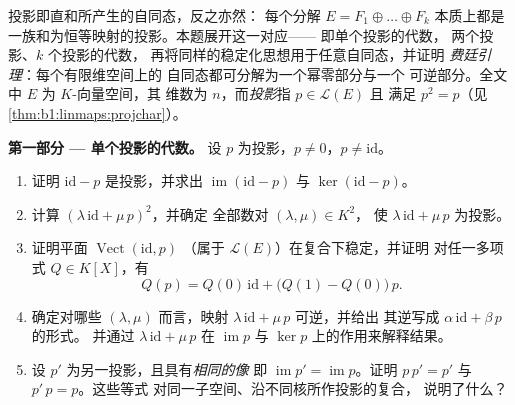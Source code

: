 \begin{problem}\label{pb:b1:linmaps:1}
投影即直和所产生的自同态，反之亦然：
每个分解 $E = F_1 \oplus \dots \oplus F_k$ 本质上都是
一族和为恒等映射的投影。本题展开这一对应——
即单个投影的代数，
两个投影、$k$ 个投影的代数，
再将同样的稳定化思想用于任意自同态，并证明
\emph{费廷引理}：每个有限维空间上的
自同态都可分解为一个幂零部分与一个
可逆部分。全文中 $E$ 为 $K$-向量空间，其
维数为 $n$，而\emph{投影}指 $p \in \mathcal{L}(E)$ 且
满足 $p^2 = p$（见\cref{thm:b1:linmaps:projchar}）。

\medskip
\noindent\textbf{第一部分 --- 单个投影的代数。}
设 $p$ 为投影，$p \neq 0$，$p \neq \mathrm{id}$。
\begin{enumerate}
  \item 证明 $\mathrm{id} - p$ 是投影，并求出
        $\operatorname{im}(\mathrm{id} - p)$ 与
        $\ker(\mathrm{id} - p)$。
  \item 计算 $(\lambda\,\mathrm{id} + \mu\,p)^2$，并确定
        全部数对 $(\lambda, \mu) \in K^2$，
        使 $\lambda\,\mathrm{id} + \mu\,p$ 为投影。
  \item 证明平面 $\operatorname{Vect}(\mathrm{id}, p)$
        （属于 $\mathcal{L}(E)$）在复合下稳定，并证明
        对任一多项式 $Q \in K[X]$，有
        \[
        Q(p) = Q(0)\,\mathrm{id} + \bigl(Q(1) -
        Q(0)\bigr)\,p .
        \]
  \item 确定对哪些 $(\lambda, \mu)$ 而言，映射
        $\lambda\,\mathrm{id} + \mu\,p$ 可逆，并给出
        其逆写成 $\alpha\,\mathrm{id} + \beta\,p$ 的形式。
        并通过
        $\lambda\,\mathrm{id} + \mu\,p$ 在 $\operatorname{im} p$
        与 $\ker p$ 上的作用来解释结果。
  \item 设 $p'$ 为另一投影，且具有\emph{相同的像}
        即 $\operatorname{im} p' = \operatorname{im} p$。证明
        $p\,p' = p'$ 与 $p'\,p = p$。这些等式
        对同一子空间、沿不同核所作投影的复合，
        说明了什么？
\end{enumerate}


\end{problem}

